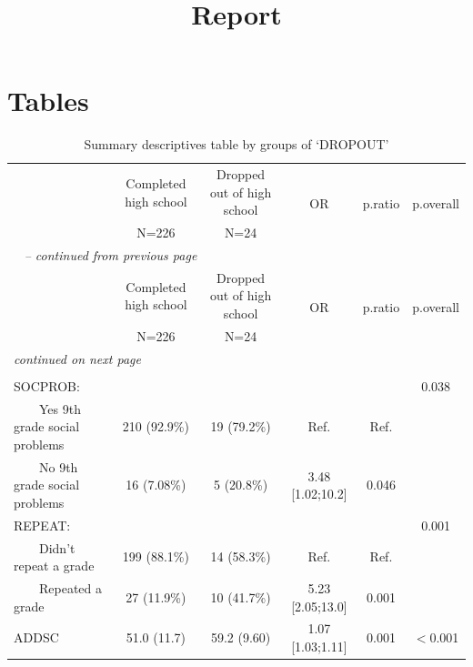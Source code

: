 \documentclass[a4paper,titlepage,12pt]{article}
\title{Report}
\begin{document}
  \maketitle
  \tableofcontents
  \listoftables
  \listoffigures
  \newpage
  \section{Tables}    
    \begin{longtable}{lccccc}\caption{Summary descriptives table by groups of `DROPOUT'}\\
    \hline  
     & Completed high school & Dropped out of high school & \multirow{2}{*}{       OR       } & \multirow{2}{*}{p.ratio} & \multirow{2}{*}{p.overall}\\ 
 &         N=226         &            N=24            &                  &         &           \\ 
  
    \hline
    \hline     
    \endfirsthead 
    \multicolumn{6}{l}{\tablename\ \thetable{} \textit{-- continued from previous page}}\\ 
    \hline
     & Completed high school & Dropped out of high school & \multirow{2}{*}{       OR       } & \multirow{2}{*}{p.ratio} & \multirow{2}{*}{p.overall}\\ 
 &         N=226         &            N=24            &                  &         &           \\ 

    \hline
    \hline  
    \endhead   
    \hline
    \multicolumn{6}{l}{\textit{continued on next page}} \\ 
    \endfoot   
    \multicolumn{6}{l}{}  \\ 
    \endlastfoot 
    SOCPROB: &                       &                            &                  &         &   0.038  \\ 
$\qquad$Yes 9th grade social problems &      210 (92.9\%)      &         19 (79.2\%)         &       Ref.       &  Ref.   &          \\ 
$\qquad$No 9th grade social problems &      16 (7.08\%)       &         5 (20.8\%)          & 3.48 [1.02;10.2] &  0.046  &          \\ 
REPEAT: &                       &                            &                  &         &   0.001  \\ 
$\qquad$Didn't repeat a grade &      199 (88.1\%)      &         14 (58.3\%)         &       Ref.       &  Ref.   &          \\ 
$\qquad$Repeated a grade &      27 (11.9\%)       &         10 (41.7\%)         & 5.23 [2.05;13.0] &  0.001  &          \\ 
ADDSC &      51.0 (11.7)      &        59.2 (9.60)         & 1.07 [1.03;1.11] &  0.001  &  $<$0.001   \\ 
 
    \hline
    \end{longtable}
  \newpage
      
\end{document}
